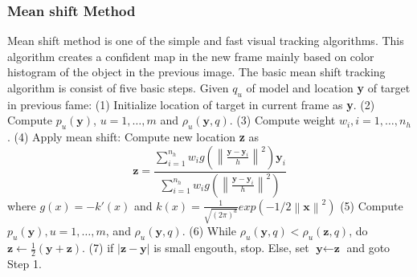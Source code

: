 \documentclass[letterpaper, 10 pt, conference]{ieeeconf}  %
\begin{document}
\subsubsection{Mean shift Method\cite{comaniciu2002mean}}
Mean shift method is one of the simple and fast visual tracking algorithms. This algorithm creates a confident map in the new frame mainly based on color histogram of the object in the previous image. The basic mean shift tracking algorithm is consist of five basic steps. Given ${q_u}$ of model and location \textbf{y} of target in previous fame: (1) Initialize location of target in current frame as \textbf{y}. (2) Compute $ {p_u(\textbf{y}) } $, $ u=1,\dots,m$ and $ \rho_u(\textbf{y},q) $. (3) Compute weight $ w_i,i=1,\dots,n_h$. (4) Apply mean shift: Compute new location \textbf{z} as
\begin{equation} 
\textbf{z}=\frac{\sum_{i=1}^{n_h} w_i g ( \left\| \frac{ \textbf{y} - \textbf{y}_i}{h}\right\|^2)\textbf{y}_i}{ \sum_{i=1}^{n_h} w_i g ( \left\| \frac{ \textbf{y} - \textbf{y}_i}{h}\right\|^2 )} 
\end{equation}                                                      
where $ g(x)=-k'(x)$ and $k(x)=\frac{1}{\sqrt{(2\pi)^d}}exp(-1/2 \left\| \textbf{x} \right\|^2)$ (5) Compute $ {p_u(\textbf{y}) },u=1,\dots,m $, and  $ \rho_u(\textbf{y},q) $. (6) While  $ \rho_u(\textbf{y},q) <   \rho_u(\textbf{z},q) $, do $ \textbf{z} \leftarrow \frac{1}{2}(\textbf{y}+\textbf{z})$. (7) if $ \left| \textbf{z} - \textbf{y} \right|$ is small engouth, stop. Else, set $ \textbf{y} \leftarrow \textbf{z}$ and goto Step 1.
\end{document}
